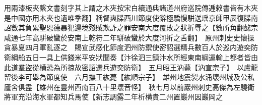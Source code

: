 用兩漆板夾繫文書刻字其上謂之木夾按宋白續通典諸道州府巡院傳逓敕書皆有木夾是中國亦用木夾也遺唯季翻】稱督爽牒西川節度使辭極驕慢駢送瑶京師甲辰復牒南詔數其負累聖恩德暴犯邊境殘賊欺詐之罪安南大度覆敗之狀折辱之【數所角翻懿宗咸通七年高駢破蠻於安南上乾符二年駢破蠻於大度河折之舌翻】　原州刺史史懷操貪暴夏四月軍亂逐之　賜宣武感化節度泗州防禦使密詔選精兵數百人於巡内遊奕防衛綱船五日一具上供錢米平安狀聞奏【汴徐泗三鎮汴水所經東南綱運輸上都者皆由此道羣盜從横恐為所掠故密詔選兵遊奕防衛】　五月昭王汭薨【汭宣宗子】　以盧龍留後李可舉為節度使　六月撫王紘薨【紘順宗子】　雄州地震裂水涌壞州城及公私廬舍俱盡【雄州在靈州西南百八十里壞音怪】　秋七月以前巖州刺史高傑為左驍衛將軍充沿海水軍都知兵馬使【新志調露二年析横貴二州置巖州因巖岡之